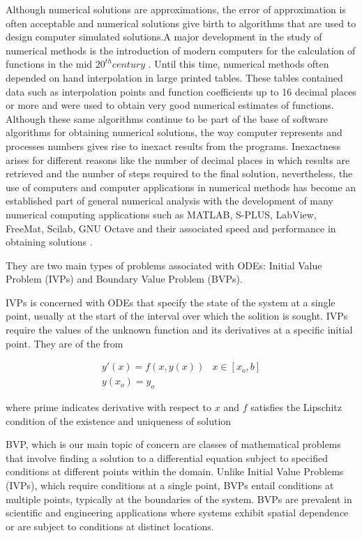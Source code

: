 Although numerical solutions are approximations, the error of approximation is often acceptable and numerical solutions give birth to algorithms that are used to design computer simulated solutions.A major development in the study of numerical methods is the introduction of modern computers for the calculation of functions in the mid $20^{th} century$ \cite{wikipedia-contributors-2023}. Until this time, numerical methods often depended on hand interpolation in large printed
tables. These tables contained data such as interpolation points and function coefficients up to 16 decimal places or more and were used to obtain very good numerical estimates of functions. Although these same algorithms continue to be part of the base of software algorithms for obtaining numerical solutions, the way computer represents and processes numbers gives rise to inexact results from the programs. Inexactness arises for different reasons like the number of decimal places in which results are retrieved and the number of steps required to the final solution, nevertheless, the use of computers and computer applications in numerical methods has become an established part of general numerical analysis with the development of many numerical computing applications such as MATLAB, S-PLUS, LabView, FreeMat, Scilab, GNU Octave and their associated speed and performance in obtaining solutions \cite{ogwo}.

They are two main types of problems associated with ODEs: Initial Value Problem (IVPs) and Boundary Value Problem (BVPs).

IVPs is concerned with ODEs that specify the state of the system at a single point, usually at the start of the interval over which the solition is sought. IVPs require the values of the unknown function and its derivatives at a specific initial point. They are of the from

\begin{center}
    \begin{eqnarray}
    y'(x) = f(x,y(x))          & x\in[x_{o},b] \\
    y(x_{o}) =  y_{o}
    \end{eqnarray}    
\end{center}
where prime indicates derivative with respect to $x$ and $f$ satisfies
the Lipschitz condition of the existence and uniqueness of solution

BVP, which is our main topic of concern are classes of mathematical problems that involve finding a solution to a differential equation subject to specified conditions at different points within the domain. Unlike Initial Value Problems (IVPs), which require conditions at a single point, BVPs entail conditions at multiple points, typically at the boundaries of the system.
BVPs are prevalent in scientific and engineering applications where systems exhibit spatial dependence or are subject to conditions at distinct locations.


